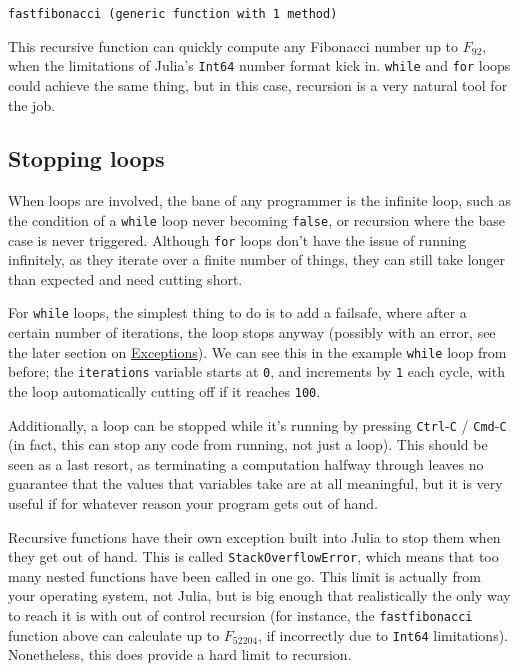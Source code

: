 \documentclass[
  letterpaper,
  DIV=11,
  numbers=noendperiod]{scrreprt}
\begin{document}
\begin{verbatim}
fastfibonacci (generic function with 1 method)
\end{verbatim}

This recursive function can quickly compute any Fibonacci number up to
\(F_{92}\), when the limitations of Julia's \texttt{Int64} number format
kick in. \texttt{while} and \texttt{for} loops could achieve the same
thing, but in this case, recursion is a very natural tool for the job.

\hypertarget{stopping-loops}{%
\subsection{Stopping loops}\label{stopping-loops}}

When loops are involved, the bane of any programmer is the infinite
loop, such as the condition of a \texttt{while} loop never becoming
\texttt{false}, or recursion where the base case is never triggered.
Although \texttt{for} loops don't have the issue of running infinitely,
as they iterate over a finite number of things, they can still take
longer than expected and need cutting short.

For \texttt{while} loops, the simplest thing to do is to add a failsafe,
where after a certain number of iterations, the loop stops anyway
(possibly with an error, see the later section on
\href{@sec-controlflow_exceptions}{Exceptions}). We can see this in the
example \texttt{while} loop from before; the \texttt{iterations}
variable starts at \texttt{0}, and increments by \texttt{1} each cycle,
with the loop automatically cutting off if it reaches \texttt{100}.

Additionally, a loop can be stopped while it's running by pressing
\texttt{Ctrl}-\texttt{C} / \texttt{Cmd}-\texttt{C} (in fact, this can
stop any code from running, not just a loop). This should be seen as a
last resort, as terminating a computation halfway through leaves no
guarantee that the values that variables take are at all meaningful, but
it is very useful if for whatever reason your program gets out of hand.

Recursive functions have their own exception built into Julia to stop
them when they get out of hand. This is called
\texttt{StackOverflowError}, which means that too many nested functions
have been called in one go. This limit is actually from your operating
system, not Julia, but is big enough that realistically the only way to
reach it is with out of control recursion (for instance, the
\texttt{fastfibonacci} function above can calculate up to \(F_{52204}\),
if incorrectly due to \texttt{Int64} limitations). Nonetheless, this
does provide a hard limit to recursion.
\end{document}
